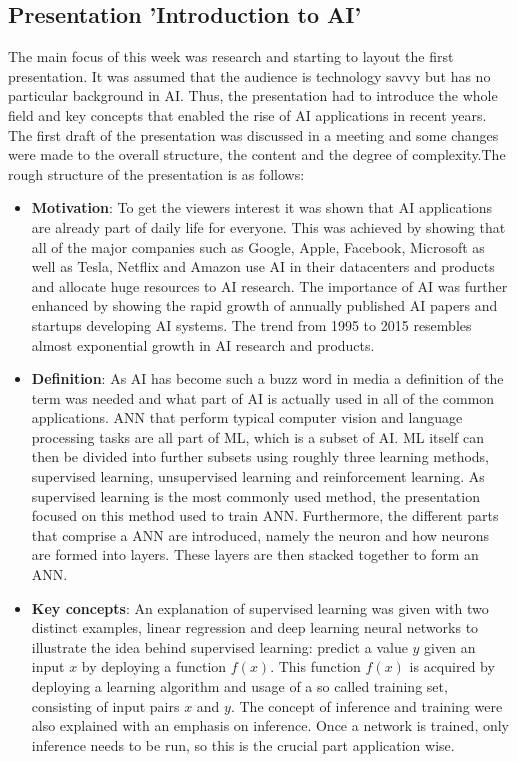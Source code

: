 \subsection{Presentation 'Introduction to \acs{AI}'}
The main focus of this week was research and starting to layout the first presentation. It was assumed that the audience is technology savvy but has no particular background in \ac{AI}. Thus, the presentation had to introduce the whole field and key concepts that enabled the rise of \ac{AI} applications in recent years. The first draft of the presentation was discussed in a meeting and some changes were made to the overall structure, the content and the degree of complexity.The rough structure of the presentation is as follows:
\begin{itemize}
	\item \textbf{Motivation}: To get the viewers interest it was shown that \ac{AI} applications are already part of daily life for everyone. This was achieved by showing that all of the major companies such as Google, Apple, Facebook, Microsoft as well as Tesla, Netflix and Amazon use \ac{AI} in their datacenters and products and allocate huge resources to \ac{AI} research. The importance of \ac{AI} was further enhanced by showing the rapid growth of annually published \ac{AI} papers and startups developing \ac{AI} systems. The trend from 1995 to 2015 resembles almost exponential growth in \ac{AI} research and products.
	\item \textbf{Definition}: As \ac{AI} has become such a buzz word in media a definition of the term was needed and what part of \ac{AI} is actually used in all of the common applications. \ac{ANN} that perform typical computer vision and language processing tasks are all part of \ac{ML}, which is a subset of \ac{AI}. \ac{ML} itself can then be divided into further subsets using roughly three learning methods, supervised learning, unsupervised learning and reinforcement learning. As supervised learning is the most commonly used method, the presentation focused on this method used to train \ac{ANN}. Furthermore, the different parts that comprise a \ac{ANN} are introduced, namely the neuron and how neurons are formed into layers. These layers are then stacked together to form an \ac{ANN}.
	\item \textbf{Key concepts}: An explanation of supervised learning was given with two distinct examples, linear regression and deep learning neural networks to illustrate the idea behind supervised learning: predict a value $y$ given an input $x$ by deploying a function $f(x)$. This function $f(x)$ is acquired by deploying a learning algorithm and usage of a so called training set, consisting of input pairs $x$ and $y$. The concept of inference and training were also explained with an emphasis on inference. Once a network is trained, only inference needs to be run, so this is the crucial part application wise.

\end{itemize}
